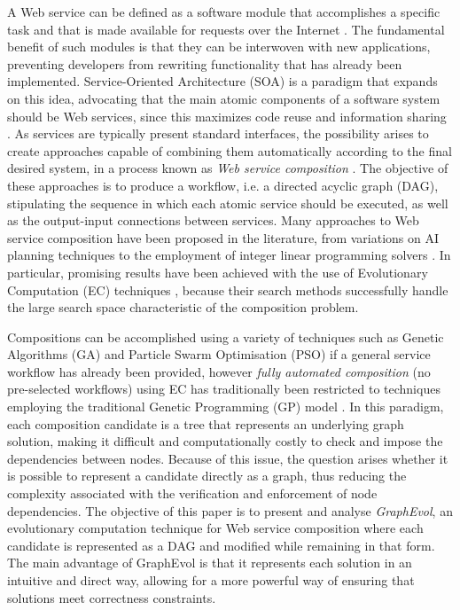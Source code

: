 \documentclass{article}
\begin{document}
A Web service can be defined as a software module that accomplishes a specific task and that is made available for requests over
the Internet \cite{gottschalk2002introduction}. The fundamental benefit of such modules is that they can be interwoven with new applications, preventing developers from rewriting
functionality that has already been implemented. Service-Oriented Architecture (SOA) is a paradigm that expands on this idea, advocating
that the main atomic components of a software system should be Web services, since this maximizes code reuse and information sharing \cite{perrey2003service,channabasavaiah2003migrating}.
As services are typically present standard interfaces, the possibility arises to create approaches capable of combining them
automatically according to the final desired system, in a process known as \textit{Web service composition} \cite{milanovic2004current}. The objective of these approaches
is to produce a workflow, i.e. a directed acyclic graph (DAG), stipulating the sequence in which each atomic service should be executed, as well as
the output-input connections between services.
Many approaches to Web service composition have been proposed in the literature, from variations on AI planning techniques \cite{deng2013efficient,bucchiarone2014domain} to the employment
of integer linear programming solvers \cite{ardagna2007adaptive,yoo2008web}. In particular, promising results have been achieved with the use of Evolutionary Computation (EC) techniques \cite{wang2012survey,su2014efficient},
because their search methods successfully handle the large search space characteristic of the composition problem. 

Compositions can be accomplished using a variety of techniques such as Genetic Algorithms (GA) and Particle Swarm Optimisation
(PSO) \cite{liu2007dynamic,wang2012survey,yin2014hybrid} if a general service workflow has already been provided, however \textit{fully automated composition} (no pre-selected workflows) using EC has traditionally been restricted to techniques employing the traditional Genetic Programming (GP) model \cite{rodriguez2010composition}.
In this paradigm, each composition candidate is a tree that represents an underlying graph solution, making it difficult and computationally costly to check and impose the dependencies between nodes. Because of this issue, the question arises whether it is possible to represent a candidate directly as a graph, thus reducing the complexity associated with the verification and enforcement of node dependencies. The objective of this paper is to present and analyse \textit{GraphEvol}, an evolutionary computation technique for Web service
composition where each candidate is represented as a DAG and modified while remaining in that form. The main
advantage of GraphEvol is that it represents each solution in an intuitive and direct way, allowing for a more powerful way of ensuring that solutions
meet correctness constraints. 
\end{document}
